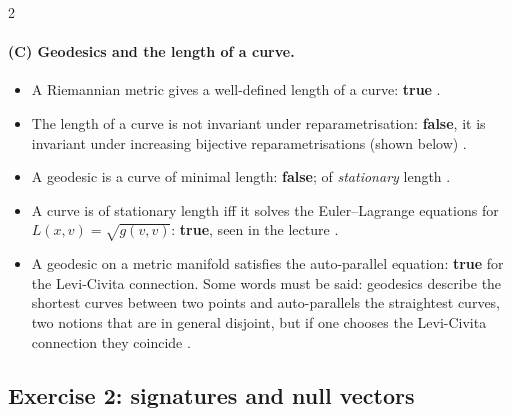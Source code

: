 \begin{paracol}{2}
\paragraph{(C) Geodesics and the length of a curve.}
\begin{itemize}
  \item A Riemannian metric gives a well-defined length of a curve: \textbf{true} .
  \item The length of a curve is not invariant under reparametrisation: \textbf{false}, it is invariant under increasing bijective reparametrisations (shown below) .
  \item A geodesic is a curve of minimal length: \textbf{false}; of \emph{stationary} length .
  \item A curve is of stationary length iff it solves the Euler--Lagrange equations for $L(x,v)=\sqrt{g(v,v)}$: \textbf{true}, seen in the lecture .
  \item A geodesic on a metric manifold satisfies the auto-parallel equation: \textbf{true} for the Levi-Civita connection. Some words must be said: geodesics describe the shortest curves between two points and auto-parallels the straightest curves, two notions that are in general disjoint, but if one chooses the Levi-Civita connection they coincide .
\end{itemize}

\subsection*{Exercise 2: signatures and null vectors}


\end{paracol}
